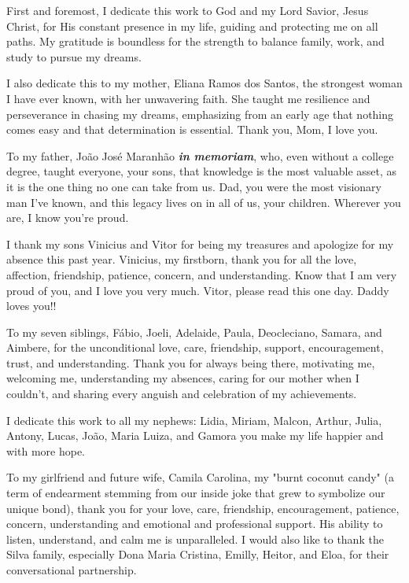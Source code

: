 \begin{dedication}
First and foremost, I dedicate this work to God and my Lord Savior, Jesus Christ, for His constant presence in my life, guiding and protecting me on all paths. My gratitude is boundless for the strength to balance family, work, and study to pursue my dreams.

I also dedicate this to my mother, Eliana Ramos dos Santos, the strongest woman I have ever known, with her unwavering faith. She taught me resilience and perseverance in chasing my dreams, emphasizing from an early age that nothing comes easy and that determination is essential. Thank you, Mom, I love you.

To my father, João José Maranhão \textbf{\textit{in memoriam}}, who, even without a college degree, taught everyone, your sons, that knowledge is the most valuable asset, as it is the one thing no one can take from us. Dad, you were the most visionary man I've known, and this legacy lives on in all of us, your children. Wherever you are, I know you're proud.

I thank my sons Vinicius and Vitor for being my treasures and apologize for my absence this past year. Vinicius, my firstborn, thank you for all the love, affection, friendship, patience, concern, and understanding. Know that I am very proud of you, and I love you very much. Vitor, please read this one day. Daddy loves you!!

To my seven siblings, Fábio, Joeli, Adelaide, Paula, Deocleciano, Samara, and Aimbere, for the unconditional love, care, friendship, support, encouragement, trust, and understanding. Thank you for always being there, motivating me, welcoming me, understanding my absences, caring for our mother when I couldn’t, and sharing every anguish and celebration of my achievements.

I dedicate this work to all my nephews: Lidia, Miriam, Malcon, Arthur, Julia, Antony, Lucas, João, Maria Luiza, and Gamora you make my life happier and with more hope.

To my girlfriend and future wife, Camila Carolina, my "burnt coconut candy" (a term of endearment stemming from our inside joke that grew to symbolize our unique bond), thank you for your love, care, friendship, encouragement, patience, concern, understanding and emotional and professional support. His ability to listen, understand, and calm me is unparalleled. I would also like to thank the Silva family, especially Dona Maria Cristina, Emilly, Heitor, and Eloa, for their conversational partnership.


\end{dedication}
